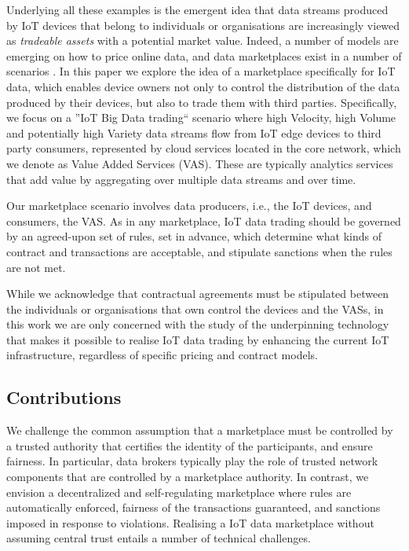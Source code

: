 \documentclass[conference]{IEEEtran}
\begin{document}
Underlying all these examples is the emergent idea that data streams produced by IoT devices that belong to individuals or organisations are increasingly viewed as \textit{tradeable assets} with a potential market value.
%
Indeed,  a number of models are emerging on how to price online data, and data marketplaces exist in a number of scenarios .
%
In this paper we explore the idea of a marketplace specifically for IoT data, which enables device owners not only to control the distribution of the data produced by their devices, but also to trade them with third parties.
%
Specifically, we focus on a ''IoT Big Data trading`` scenario where high Velocity, high Volume and potentially high Variety data streams flow from IoT edge devices to third party consumers, represented by cloud services located in the core network, which we denote as Value Added Services (VAS). These are typically analytics services that add value by aggregating over multiple data streams and over time.

Our marketplace scenario involves data producers, i.e., the IoT devices, and consumers, the VAS. 
As in any marketplace, IoT data trading should be governed by an agreed-upon set of rules, set in advance, which determine what kinds of contract and transactions are acceptable, and stipulate sanctions when the rules are not met.

While we acknowledge that contractual agreements must be stipulated between the individuals or organisations that own control the devices and the VASs, in this work we are only concerned with the study of the underpinning technology that makes it possible to realise IoT data trading by enhancing the current IoT infrastructure, regardless of specific pricing and contract models.

\subsection{Contributions}

We challenge the common assumption that a marketplace must be controlled by a trusted authority that certifies the identity of the participants, and ensure fairness. 
In particular, data brokers typically play the role of trusted network components that are controlled by a marketplace authority.
%
In contrast, we envision a decentralized and self-regulating marketplace where rules are automatically enforced,  fairness of the transactions guaranteed, and sanctions imposed in response to violations.
%
Realising a IoT data marketplace without assuming central trust entails a number of technical challenges.
\end{document}
